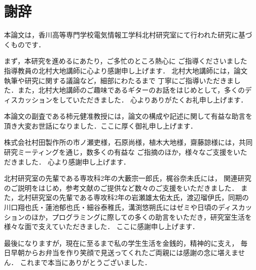 \chapter{謝辞}

本論文は，香川高等専門学校電気情報工学科北村研究室にて行われた研究に基づくものです．

まず，本研究を進めるにあたり，ご多忙のところ熱心に
ご指導くださいました指導教員の北村大地講師に心より感謝申し上げます．
北村大地講師には，論文執筆や研究に関する議論など，細部にわたるまで
丁寧にご指導いただきました．また，北村大地講師のご趣味であるギターのお話をはじめとして，多くのディスカッションをしていただきました．
心よりありがたくお礼申し上げます．

本論文の副査である柿元健准教授には，論文の構成や記述に関して有益な助言を頂き大変お世話になりました．ここに厚く御礼申し上げます．

株式会社村田製作所の市ノ瀬吏様，石原尚様，植木大地様，齋藤諒様には，共同研究ミーティングを通じ，数多くの有益な
ご指摘のほか，様々なご支援をいただきました．
心より感謝申し上げます．

北村研究室の先輩である専攻科2年の大藪宗一郎氏，梶谷奈未氏には，
関連研究のご説明をはじめ，参考文献のご提供など数々のご支援をいただきました．
また，北村研究室の先輩である専攻科2年の岩瀬雄太佑太氏，渡辺瑠伊氏，同期の川口翔也氏・蓮池郁也氏・細谷泰稚氏，溝渕悠朔氏にはゼミや日頃のディスカッションのほか，プログラミングに際しての多くの助言をいただき，研究室生活を様々な面で支えていただきました．
ここに感謝申し上げます．

最後になりますが，現在に至るまで私の学生生活を金銭的，精神的に支え，
毎日早朝からお弁当を作り笑顔で見送ってくれたご両親には感謝の念に堪えません．
これまで本当にありがとうございました．
